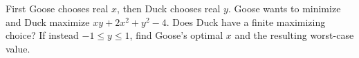 First Goose chooses real $x$, then Duck chooses real $y$. Goose wants to minimize and Duck maximize $xy+2x^2+y^2-4$. Does Duck have a finite maximizing choice? If instead $-1\le y\le1$, find Goose's optimal $x$ and the resulting worst-case value.
